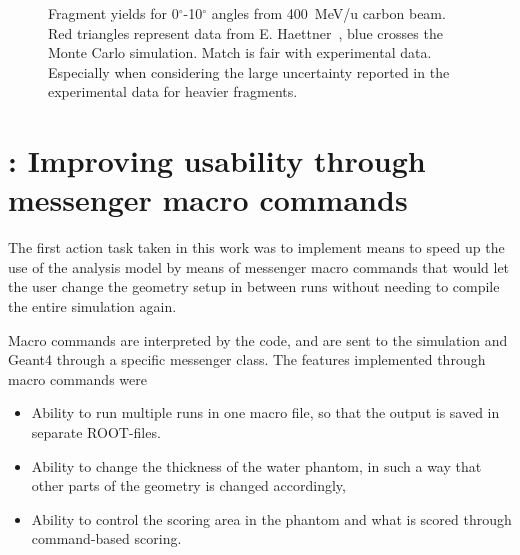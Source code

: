 \begin{figure}[!ht]
{\label{fig:fragmentYieldsForB}
}
\label{fig:fragmentYieldsZeroToTenDegrees}
\caption[Optional caption for list of figures]{Fragment yields for 0$^{\circ}$-10$^{\circ}$ angles from 400~MeV/u carbon beam. Red triangles represent data from E. Haettner~\cite{ehaettner}, blue crosses the Monte Carlo simulation. Match is fair with experimental data. Especially when considering the large uncertainty reported in the experimental data for heavier fragments.}
\end{figure}

\clearpage
\clearpage


\renewcommand{\theequation}{C\arabic{equation}}
\setcounter{equation}{0}  
\renewcommand{\thefigure}{C\arabic{figure}}
\setcounter{figure}{0}
\renewcommand{\thetable}{C\arabic{table}}
\setcounter{table}{0}
\renewcommand{\thesection}{C}
\setcounter{section}{1}
\section{\label{AppendixD}: Improving usability through messenger macro commands}

The first action task taken in this work was to implement means to speed up the use of the analysis model by means of messenger macro commands that would let the user change the geometry setup in between runs without needing to compile the entire simulation again.

Macro commands are interpreted by the code, and are sent to the simulation and Geant4 through a specific messenger class. The features implemented through macro commands were
\begin{itemize}
\item Ability to run multiple runs in one macro file, so that the output is saved in separate ROOT-files.
\item Ability to change the thickness of the water phantom, in such a way that other parts of the geometry is changed accordingly,
\item Ability to control the scoring area in the phantom and what is scored through command-based scoring.
\end{itemize}



